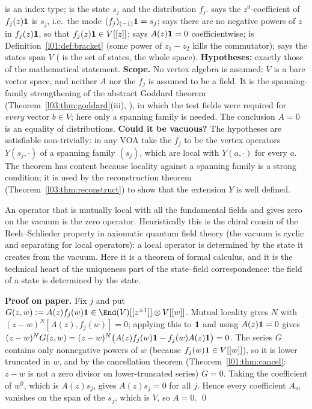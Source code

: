 \begin{dictionary}
 is an index type;  is the state $s_j$ and  the distribution $f_j$. 
says the $z^0$-coefficient of $f_j(z)\mathbf{1}$ is $s_j$, i.e.\ the mode $(f_j)_{(-1)}\mathbf{1} = s_j$;
 says there are no negative powers of $z$ in $f_j(z)\mathbf{1}$, so that $f_j(z)\mathbf{1}\in V[[z]]$;
 says $A(z)\mathbf{1} = 0$ coefficientwise;  is
Definition~\ref{l01:def:bracket} (some power of $z_1-z_2$ kills the commutator);  says the states span $V$
( is the set of states,  the whole space). \textbf{Hypotheses:} exactly those of the
mathematical statement. \textbf{Scope.} No vertex algebra is assumed: $V$ is a bare vector space, and neither $A$ nor
the $f_j$ is assumed to be a field. It is the spanning-family strengthening of the abstract Goddard theorem
(Theorem~\ref{l03:thm:goddard}(iii), ), in which the test fields were required for \emph{every} vector
$b\in V$; here only a spanning family is needed. The conclusion $A=0$ is an equality of distributions. \textbf{Could it be
vacuous?} The hypotheses are satisfiable
non-trivially: in any VOA take the $f_j$ to be the vertex operators $Y(s_j,\cdot)$ of a spanning family $(s_j)$, which
are local with $Y(a,\cdot)$ for every $a$. The theorem has content because locality against a spanning family is a
strong condition; it is used by the reconstruction theorem (Theorem~\ref{l03:thm:reconstruct}) to show that the
extension $Y$ is well defined.
\end{dictionary}

\begin{physics}
An operator that is mutually local with all the fundamental fields and gives zero on the vacuum is the zero
operator. Heuristically this is the chiral cousin of the Reeh--Schlieder property in axiomatic quantum field
theory (the vacuum is cyclic and separating for local operators): a local operator is determined by the state it
creates from the vacuum. Here it is a theorem of formal calculus, and it is the technical heart of the uniqueness part
of the state--field correspondence: the field of a state is determined by the state.
\end{physics}

\textbf{Proof on paper.} Fix $j$ and put $G(z,w) := A(z)f_j(w)\lthreevac\in\End(V)[[z^{\pm1}]]\otimes V[[w]]$. Mutual
locality gives $N$ with $(z-w)^N[A(z),f_j(w)] = 0$; applying this to $\mathbf{1}$ and using $A(z)\mathbf{1} = 0$ gives
$(z-w)^NG(z,w) = (z-w)^N\big(A(z)f_j(w)\mathbf{1} - f_j(w)A(z)\mathbf{1}\big) = 0$. The series $G$ contains only
nonnegative powers of $w$ (because $f_j(w)\mathbf{1}\in V[[w]]$), so it is lower truncated in $w$, and by the
cancellation theorem (Theorem~\ref{l01:thm:cancel}: $z-w$ is not a zero divisor on lower-truncated series) $G=0$.
Taking the coefficient of $w^0$, which is $A(z)s_j$, gives $A(z)s_j = 0$ for all $j$. Hence every coefficient
$A_m$ vanishes on the span of the $s_j$, which is $V$, so $A=0$. \qed

